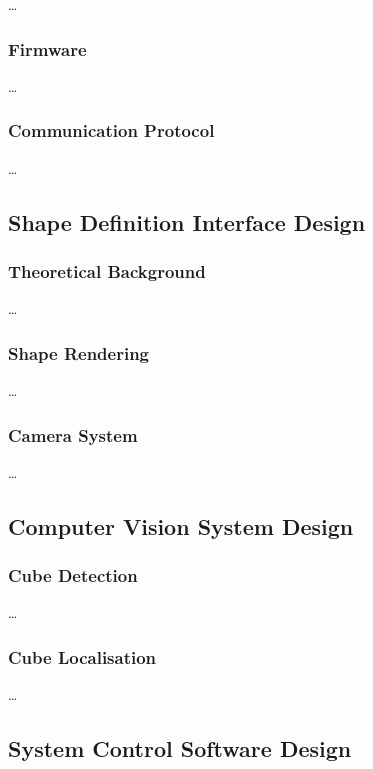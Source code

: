 \ldots

\subsubsection{Firmware}

\ldots

\subsubsection{Communication Protocol}

\ldots

\subsection{Shape Definition Interface Design}

\subsubsection{Theoretical Background}

\ldots

\subsubsection{Shape Rendering}

\ldots

\subsubsection{Camera System}

\ldots

\subsection{Computer Vision System Design}

\subsubsection{Cube Detection}

\ldots

\subsubsection{Cube Localisation}

\ldots

\subsection{System Control Software Design}

